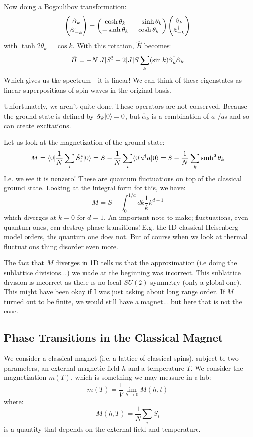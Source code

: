 Now doing a Bogoulibov transformation:
\begin{equation}
    \begin{pmatrix}\hat{\alpha}_k \\ \hat{\alpha}^\dagger_{-k}\end{pmatrix} = \begin{pmatrix}\cosh \theta_k & -\sinh \theta_k \\ -\sinh\theta_k & \cosh\theta_k\end{pmatrix}\begin{pmatrix}\hat{a}_k \\ \hat{a}^\dagger_{-k}\end{pmatrix}
\end{equation}
with $\tanh 2\theta_k = \cos k$. With this rotation, $\hat{H}$ becomes:
\begin{equation}
    \hat{H} = -N\lvert J \rvert S^2 + 2\lvert J \rvert S\sum_k(\sin k)\hat{\alpha}^\dagger_k \hat{\alpha}_k
\end{equation}
Which gives us the spectrum - it is linear! We can think of these eigenstates as linear superpositions of spin waves in the original basis.

Unfortunately, we aren't quite done. These operators are not conserved. Because the ground state is defined by $\hat{\alpha}_k\lvert 0 \rangle = 0$, but $\hat{\alpha}_k$ is a combination of $a^\dag/a$s and so can create excitations.

Let us look at the magnetization of the ground state:
\begin{equation}
    M = \langle 0 \rvert \frac{1}{N}\sum_i \hat{S}^z_i\lvert 0 \rangle = S - \frac{1}{N}\sum_i \langle 0 \rvert a^\dagger a \lvert 0 \rangle = S - \frac{1}{N}\sum_k \sinh^2\theta_k
\end{equation}
I.e. we see it is nonzero! These are quantum fluctuations on top of the classical ground state. Looking at the integral form for this, we have:
\begin{equation}
    M = S - \int_0^{1/a}dk \frac{1}{k} k^{d-1}
\end{equation}
which diverges at $k = 0$ for $d = 1$. An important note to make; fluctuations, even quantum ones, can destroy phase transitions! E.g. the 1D classical Heisenberg model orders, the quantum one does not. But of course when we look at thermal fluctuations thing disorder even more.

The fact that $M$ diverges in 1D tells us that the approximation (i.e doing the sublattice divisions...) we made at the beginning was incorrect. This sublattice division is incorrect as there is no local $SU(2)$ symmetry (only a global one). This might have been okay if I was just asking about long range order. If $M$ turned out to be finite, we would still have a magnet... but here that is not the case.

\subsection{Phase Transitions in the Classical Magnet}
We consider a classical magnet (i.e. a lattice of classical spins), subject to two parameters, an external magnetic field $h$ and a temperature $T$. We consider the magnetization $m(T)$, which is something we may measure in a lab:
\begin{equation}
    m(T) = \frac{1}{V}\lim_{h \to 0}M(h, t)
\end{equation}
where:
\begin{equation}
    M(h, T) = \frac{1}{N}\sum_i S_i
\end{equation}
is a quantity that depends on the external field and temperature.

